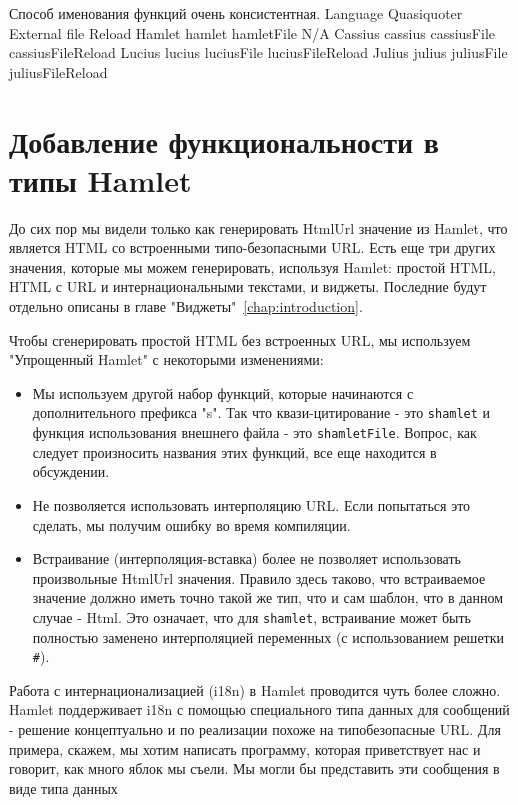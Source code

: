 Способ именования функций очень консистентная.
Language	Quasiquoter	External file	Reload
Hamlet	hamlet	hamletFile	N/A
Cassius	cassius	cassiusFile	cassiusFileReload
Lucius	lucius	luciusFile	luciusFileReload
Julius	julius	juliusFile	juliusFileReload

\section{Добавление функциональности в типы Hamlet}
До сих пор мы видели только как генерировать HtmlUrl значение из Hamlet, что 
является HTML со встроенными типо-безопасными URL. Есть еще три других значения, 
которые мы можем генерировать, используя Hamlet: простой HTML, HTML с URL и 
интернациональными текстами, и виджеты.
Последние будут отдельно описаны в главе "Виджеты"~\ref{chap:introduction}.

Чтобы сгенерировать простой HTML без встроенных URL, мы используем 
"Упрощенный Hamlet" с некоторыми изменениями:

\begin{itemize}
\item Мы используем другой набор функций, которые начинаются с дополнительного 
префикса "s". Так что квази-цитирование - это \texttt{shamlet} и функция 
использования внешнего файла - это \texttt{shamletFile}. Вопрос, как следует произносить
названия этих функций, все еще находится в обсуждении.
\item Не позволяется использовать интерполяцию URL. Если попытаться это сделать, 
мы получим ошибку во время компиляции.
\item Встраивание (интерполяция-вставка) более не позволяет использовать произвольные
HtmlUrl значения. Правило здесь таково, что встраиваемое значение должно иметь
точно такой же тип, что и сам шаблон, что в данном случае - Html. Это означает,
что для \texttt{shamlet}, встраивание может быть полностью заменено интерполяцией
переменных (с использованием решетки \texttt{#}).
\end{itemize}

Работа с интернационализацией (i18n) в Hamlet проводится чуть более сложно.
Hamlet поддерживает i18n с помощью специального типа данных для сообщений - решение
концептуально и по реализации похоже на типобезопасные URL. Для примера, скажем, 
мы хотим написать программу, которая приветствует нас и говорит, как много яблок 
мы съели. Мы могли бы представить эти сообщения в виде типа данных


